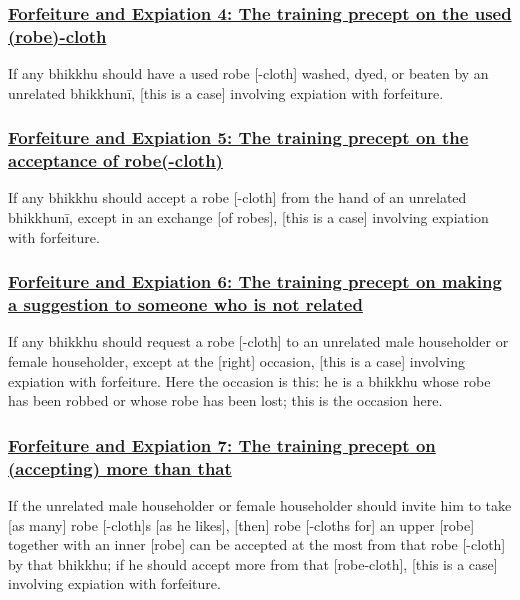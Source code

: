 \subsubsection*{\hyperref[np4]{Forfeiture and Expiation 4: The training precept on the used (robe)-cloth}}
\label{forf-exp4}
If any bhikkhu should have a used robe [-cloth] washed, dyed, or beaten by an unrelated bhikkhunī, [this is a case] involving expiation with forfeiture.

\subsubsection*{\hyperref[np5]{Forfeiture and Expiation 5: The training precept on the acceptance of robe(-cloth)}}
\label{forf-exp5}
If any bhikkhu should accept a robe [-cloth] from the hand of an unrelated bhikkhunī, except in an exchange [of robes], [this is a case] involving expiation with forfeiture.

\subsubsection*{\hyperref[np6]{Forfeiture and Expiation 6: The training precept on making a suggestion to someone who is not related}}
\label{forf-exp6}
If any bhikkhu should request a robe [-cloth] to an unrelated male householder or female householder, except at the [right] occasion, [this is a case] involving expiation with forfeiture. Here the occasion is this: he is a bhikkhu whose robe has been robbed or whose robe has been lost; this is the occasion here.

\subsubsection*{\hyperref[np7]{Forfeiture and Expiation 7: The training precept on (accepting) more than that}}
\label{forf-exp7}
If the unrelated male householder or female householder should invite him to take [as many] robe [-cloth]s [as he likes], [then] robe [-cloths for] an upper [robe] together with an inner [robe] can be accepted at the most from that robe [-cloth] by that bhikkhu; if he should accept more from that [robe-cloth], [this is a case] involving expiation with forfeiture.

